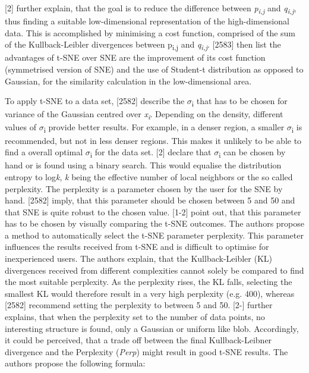 \textcite{hinton2003stochastic}[2] further explain, that the goal is to reduce the difference between \textit{p\textsubscript{i,j}} and \textit{q\textsubscript{i,j}}, thus finding a suitable low-dimensional representation of the high-dimensional data. This is accomplished by minimising a cost function, comprised of the sum of the Kullback-Leibler divergences between {p\textsubscript{i,j}} and \textit{q\textsubscript{i,j}}. 
\textcite{maaten2008visualizing}[2583] then list the advantages of t-SNE over SNE are the improvement of its cost function (symmetrised version of SNE) and the use of Student-t distribution as opposed to Gaussian, for the similarity calculation in the low-dimensional area.

To apply t-SNE to a data set, \textcite{maaten2008visualizing}[2582] describe the $\sigma$\textsubscript{i} that has to be chosen for variance of the Gaussian centred over \textit{x\textsubscript{i}}. Depending on the density, different values of $\sigma$\textsubscript{i} provide better results. For example, in a denser region, a smaller $\sigma$\textsubscript{i} is recommended, but not in less denser regions. This makes it unlikely to be able to find a overall optimal  $\sigma$\textsubscript{i} for the data set. \textcite{hinton2003stochastic}[2] declare that $\sigma$\textsubscript{i} can be chosen by hand or is found using a binary search. This would equalise the distribution entropy to log\textit{k}, \textit{k} being the effective number of local neighbors or the so called perplexity. The perplexity is a parameter chosen by the user for the SNE by hand. \textcite{maaten2008visualizing}[2582] imply, that this parameter should be chosen between 5 and 50 and that SNE is quite robust to the chosen value. 
\textcite{tsneAutomaticPerplexity}[1-2] point out, that this parameter has to be chosen by visually comparing the t-SNE outcomes. The authors propose a method to automatically select the t-SNE parameter perplexity. This parameter influences the results received from t-SNE and is difficult to optimise for inexperienced users. The authors explain, that the Kullback-Leibler (KL) divergences received from different complexities cannot solely be compared to find the most suitable perplexity. As the perplexity rises, the KL falls, selecting the smallest KL would therefore result in a very high perplexity (e.g. 400), whereas \textcite{maaten2008visualizing}[2582] recommend setting the perplexity to between 5 and 50. \textcite{tsneAutomaticPerplexity}[2-] further explains, that when the perplexity set to the number of data points, no interesting structure is found, only a Gaussian or uniform like blob. Accordingly, it could be perceived, that a trade off between the final Kullback-Leibner divergence and the Perplexity (\textit{Perp}) might result in good t-SNE results. The authors propose the following formula:

